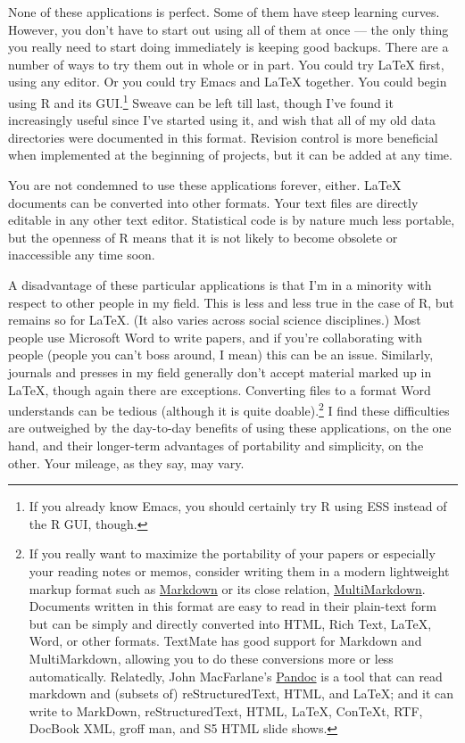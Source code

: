 \documentclass[11pt,article,oneside]{memoir}
\begin{document}
None of these applications is perfect. Some of them have steep learning curves. However, you don't have to start out using all of them at once --- the only thing you really need to start doing immediately is keeping good backups. There are a number of ways to try them out in whole or in part. You could try LaTeX first, using any editor. Or you could try Emacs and LaTeX together. You could begin using R and its GUI.\footnote{If you already know Emacs, you should certainly try R using ESS instead of the R GUI, though.} Sweave can be left till last, though I've found it increasingly useful since I've started using it, and wish that all of my old data directories were documented in this format. Revision control is more beneficial when implemented at the beginning of projects, but it can be added at any time. 

You are not condemned to use these applications forever, either. LaTeX documents can be converted into other formats. Your text files are directly editable in any other text editor. Statistical code is by nature much less portable, but the openness of R means that it is not likely to become obsolete or inaccessible any time soon.

A disadvantage of these particular applications is that I'm in a minority with respect to other people in my field. This is less and less true in the case of R, but remains so for LaTeX. (It also varies across social science disciplines.) Most people use Microsoft Word to write papers, and if you're collaborating with people (people you can't boss around, I mean) this can be an issue. Similarly, journals and presses in my field generally don't accept material marked up in LaTeX, though again there are exceptions. Converting files to a format Word understands can be tedious (although it is quite doable).\footnote{If you really want to maximize the portability of your papers or especially your reading notes or memos, consider writing them in a modern lightweight markup format  such as \href{http://en.wikipedia.org/wiki/Markdown}{Markdown} or its close relation, \href{http://fletcherpenney.net/MultiMarkdown}{MultiMarkdown}. Documents written in this format are easy to read in their plain-text form but can be simply and directly converted into HTML, Rich Text, LaTeX, Word, or other formats. TextMate has good support for Markdown and MultiMarkdown, allowing you to do these conversions more or less automatically. Relatedly, John MacFarlane's \href{http://johnmacfarlane.net/pandoc/}{Pandoc} is a tool that can read markdown and (subsets of) reStructuredText, HTML, and LaTeX; and it can write to MarkDown, reStructuredText, HTML, LaTeX, ConTeXt, RTF, DocBook XML, groff man, and S5 HTML slide shows.} I find these difficulties are outweighed by the day-to-day benefits of using these applications, on the one hand, and their longer-term advantages of portability and simplicity, on the other. Your mileage, as they say, may vary.
\end{document}
